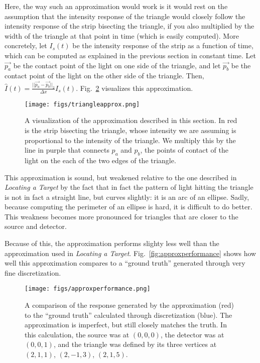 \documentclass[11pt]{article}
\begin{document}
Here, the way such an approximation would work is it would rest on the assumption that the intensity response of the triangle would closely follow the intensity response of the strip bisecting the triangle, if you also multiplied by the width of the triangle at that point in time (which is easily computed). More concretely, let $I_s(t)$ be the intensity response of the strip as a function of time, which can be computed as explained in the previous section in constant time. Let $\vec{p_a}$ be the contact point of the light on one side of the triangle, and let $\vec{p_b}$ be the contact point of the light on the other side of the triangle. Then, $\hat{I}(t) = \frac{||\vec{p_a} - \vec{p_b}||_2}{\Delta x} I_s(t)$. Fig.~\ref{fig:triangapprox} visualizes this approximation.

\begin{figure}
\begin{center}
\centering
\texttt{[image: figs/triangleapprox.png]}
\caption{A visualization of the approximation described in this section. In red is the strip bisecting the triangle, whose intensity we are assuming is proportional to the intensity of the triangle. We multiply this by the line in purple that connects $p_a$ and $p_b$, the points of contact of the light on the each of the two edges of the triangle. \label{fig:triangapprox}}
\end{center}
\end{figure}

This approximation is sound, but weakened relative to the one described in \emph{Locating a Target} by the fact that in fact the pattern of light hitting the triangle is not in fact a straight line, but curves slightly: it is an arc of an ellipse. Sadly, because computing the perimeter of an ellipse is hard, it is difficult to do better. This weakness becomes more pronounced for triangles that are closer to the source and detector.

Because of this, the approximation performs slighty less well than the approximation used in \emph{Locating a Target}. Fig.~\ref{fig:approxperformance} shows how well this approximation compares to a ``ground truth'' generated through very fine discretization.

\begin{figure}
\begin{center}
\centering
\texttt{[image: figs/approxperformance.png]}
\caption{A comparison of the response generated by the approximation (red) to the ``ground truth'' calculated through discretization (blue). The approximation is imperfect, but still closely matches the truth. In this calculation, the source was at $(0,0,0)$, the detector was at $(0,0,1)$, and the triangle was defined by its three vertices at $(2,1,1)$, $(2,-1,3)$, $(2,1,5)$. \label{fig:triangapprox}}
\end{center}
\end{figure}
\end{document}
